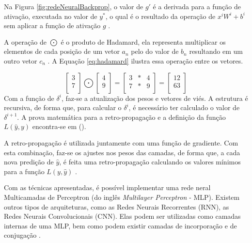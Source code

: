 Na Figura \ref{fig:redeNeuralBackprop}, o valor de $g'$ é a derivada para a função de ativação, executada no valor de $y^{*}$, o qual é o resultado da operação de $x^{i}W^{i} + b^{i}$ sem aplicar a função de ativação $g$ \cite{NIELSEN2015}.

A operação de $\bigodot$ é o produto de Hadamard, ela representa multiplicar os elementos de cada posição de um vetor $a_{n}$ pelo do valor de $b_{n}$ resultando em um outro vetor $c_{n}$ \cite{NIELSEN2015}. A Equação \ref{eq:hadamard} ilustra essa operação entre os vetores.

\begin{equation}
	\label{eq:hadamard}
	\begin{bmatrix}
    	3 \\
        7 \\
	\end{bmatrix}
    \bigodot
    \begin{bmatrix}
    	4 \\
        9 \\
	\end{bmatrix}
    =
    \begin{bmatrix}
       3 & * & 4 \\
       7 & * & 9 \\
    \end{bmatrix}
     =
    \begin{bmatrix}
    	12 \\
        63 \\
	\end{bmatrix}     
\end{equation}
Com a função de $\delta^{i}$, faz-se a atualização dos pesos e vetores de viés. A estrutura é recursiva, de forma que, para calcular o $\delta^{i}$, é necessário ter calculado o valor de $\delta^{i+1}$. A prova matemática para a retro-propagação e a definição da função $L(\hat{y}, y)$ encontra-se em \citeauthor{NIELSEN2015} (\citeyear{NIELSEN2015}).

A retro-propagação é utilizada juntamente com uma função de gradiente. Com esta combinação, faz-se os ajustes nos pesos das camadas, de forma que, a cada nova predição de $\hat{y}$, é feita uma retro-propagação calculando os valores mínimos para a função $L(y, \hat{y})$ \cite{NIELSEN2015}.

Com as técnicas apresentadas, é possível implementar uma rede neral Multicamadas de Perceptron (do inglês \textit{Multilayer Perceptron} - MLP). Existem outros tipos de arquiteturas, como as Redes Neurais Recorrentes (RNN), as Redes Neurais Convolucionais (CNN). Elas podem ser utilizadas como camadas internas de uma MLP, bem como podem existir camadas de incorporação e de conjugação \cite{GOLDBERG2017}.

